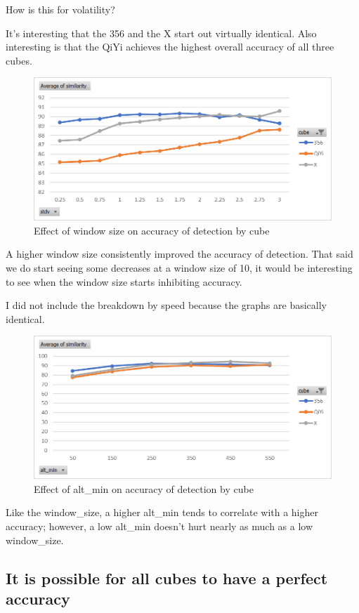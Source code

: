 How is this for volatility? 

It's interesting that the 356 and the X start out virtually identical.
Also interesting is that the QiYi achieves the highest overall accuracy
of all three cubes.

\begin{figure}[h]
    \centering
    \caption{Effect of window size on accuracy of detection by cube}
    \label{fig:similarity-by-window-size}
    \includegraphics[width=0.75\linewidth]{Figures/7 Evaluation/similarity_by_cube.png}
\end{figure}

A higher window size consistently improved the accuracy of detection.
That said we do start seeing some decreases at a window size of 10, it
would be interesting to see when the window size starts inhibiting
accuracy.

I did not include the breakdown by speed because the graphs are
basically identical.

\begin{figure}[h]
    \centering
    \caption{Effect of alt\_min on accuracy of detection by cube}
    \label{fig:similarity-by-alt-min}
    \includegraphics[width=0.75\linewidth]{Figures/7 Evaluation/similarity_by_alt_min.png}
\end{figure}

Like the window\_size, a higher alt\_min tends to correlate with a
higher accuracy; however, a low alt\_min doesn't hurt nearly as much as
a low window\_size.

\subsection{It is possible for all cubes to have a perfect accuracy}

